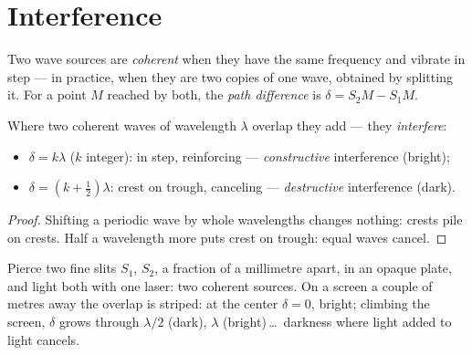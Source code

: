 \section{Interference}

\begin{definition}\label{def:g12:light-as-wave:coherent}
Two wave sources are \emph{coherent} when
they have the same frequency and vibrate in step --- in practice,
when they are two copies of one wave, obtained by splitting it. For a
point $M$ reached by both, the \emph{path difference}%
 is $\delta = S_2M - S_1M$.
\end{definition}

\begin{proposition}\label{prop:g12:light-as-wave:conditions}
Where two coherent waves of wavelength $\lambda$ overlap they add ---
they \emph{interfere}:
\begin{itemize}
  \item $\delta = k\lambda$ ($k$ integer): in step, reinforcing ---
        \emph{constructive} interference (bright);
  \item $\delta = (k + \tfrac12)\lambda$: crest on trough, canceling
        --- \emph{destructive} interference (dark).
\end{itemize}
\end{proposition}

\begin{proof}
Shifting a periodic wave by whole wavelengths changes nothing: crests
pile on crests. Half a wavelength more puts crest on trough: equal
waves cancel.
\end{proof}

\begin{example}\label{ex:g12:light-as-wave:young}
Pierce two fine slits $S_1$, $S_2$, a fraction of a millimetre apart,
in an opaque plate, and light both with one laser: two coherent
sources. On a screen a couple of metres away the overlap is striped:
at the center $\delta = 0$, bright; climbing the screen, $\delta$
grows through $\lambda/2$ (dark), $\lambda$ (bright)\,\dots\ darkness
where light added to light cancels.
\end{example}

